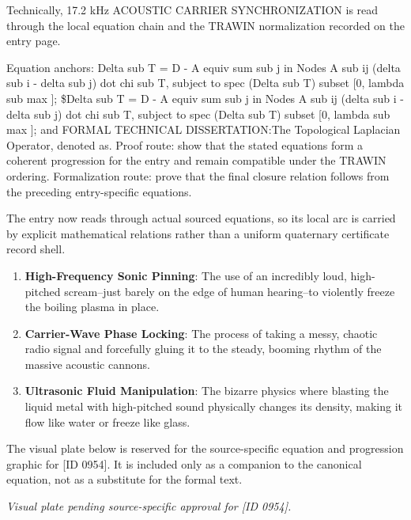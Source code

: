 Technically, 17.2 kHz ACOUSTIC CARRIER SYNCHRONIZATION is read through the local equation chain and the TRAWIN normalization recorded on the entry page.

Equation anchors: Delta sub T = D - A equiv sum sub j in Nodes A sub ij (delta sub i - delta sub j) dot chi sub T, subject to spec (Delta sub T) subset [0, lambda sub max ]; \$Delta sub T = D - A equiv sum sub j in Nodes A sub ij (delta sub i - delta sub j) dot chi sub T, subject to spec (Delta sub T) subset [0, lambda sub max ]; and FORMAL TECHNICAL DISSERTATION:The Topological Laplacian Operator, denoted as. Proof route: show that the stated equations form a coherent progression for the entry and remain compatible under the TRAWIN ordering. Formalization route: prove that the final closure relation follows from the preceding entry-specific equations.

The entry now reads through actual sourced equations, so its local arc is carried by explicit mathematical relations rather than a uniform quaternary certificate record shell.
\endgroup

\begin{enumerate}[leftmargin=1.6em,itemsep=6pt,topsep=4pt]
\item \textbf{High-Frequency Sonic Pinning}: The use of an incredibly loud, high-pitched scream--just barely on the edge of human hearing--to violently freeze the boiling plasma in place.
\item \textbf{Carrier-Wave Phase Locking}: The process of taking a messy, chaotic radio signal and forcefully gluing it to the steady, booming rhythm of the massive acoustic cannons.
\item \textbf{Ultrasonic Fluid Manipulation}: The bizarre physics where blasting the liquid metal with high-pitched sound physically changes its density, making it flow like water or freeze like glass.
\end{enumerate}

\begingroup\footnotesize\sloppy
The visual plate below is reserved for the source-specific equation and progression graphic for [ID 0954]. It is included only as a companion to the canonical equation, not as a substitute for the formal text.
\par\endgroup
\begingroup\footnotesize\itshape
Visual plate pending source-specific approval for [ID 0954].
\par\endgroup

